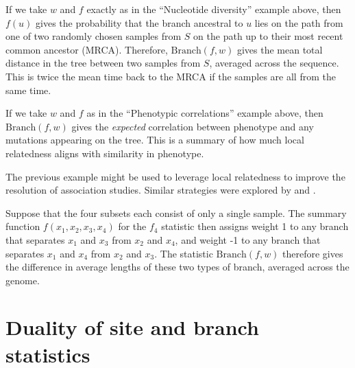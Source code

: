 \documentclass{article}
\newcommand{\branch}{\mbox{Branch}} %
\newcommand{\iw}{w} %
\begin{document}
\begin{example} \label{ex:branch_diversity}
    If we take $\iw$ and $f$ exactly as in the ``Nucleotide diversity'' example above,
    then $f(u)$ gives the probability that the branch ancestral to $u$
    lies on the path from one of two randomly chosen samples from $S$
    on the path up to their most recent common ancestor (MRCA).
    Therefore, $\branch(f, \iw)$
    gives the mean total distance in the tree between two samples from $S$,
    averaged across the sequence.
    This is twice the mean time back to the MRCA if the samples are all from the same time.
\end{example}

\begin{example} \label{ex:branch_correlation}
    If we take $\iw$ and $f$ as in the ``Phenotypic correlations'' example above,
    then $\branch(f, \iw)$ gives the \emph{expected} correlation between phenotype and any mutations
    appearing on the tree. This is a summary of how much local relatedness
    aligns with similarity in phenotype.
\end{example}

The previous example might be used to leverage local relatedness
to improve the resolution of association studies.
Similar strategies were explored by \citet{zollner2005coalescent} and \citet{minichiello2006mapping}.

\begin{example}[Patterson's $f_4$] \label{ex:branch_f4} 
    Suppose that the four subsets each consist of only a single sample.
    The summary function $f(x_1, x_2, x_3, x_4)$ for the $f_4$ statistic
    then assigns weight 1 to any branch that separates $x_1$ and $x_3$ from $x_2$ and $x_4$,
    and weight -1 to any branch that separates $x_1$ and $x_4$ from $x_2$ and $x_3$.
    The statistic $\branch(f, \iw)$ therefore
    gives the difference in average lengths of these two types of branch,
    averaged across the genome.
\end{example}



\section*{Duality of site and branch statistics}
\end{document}
